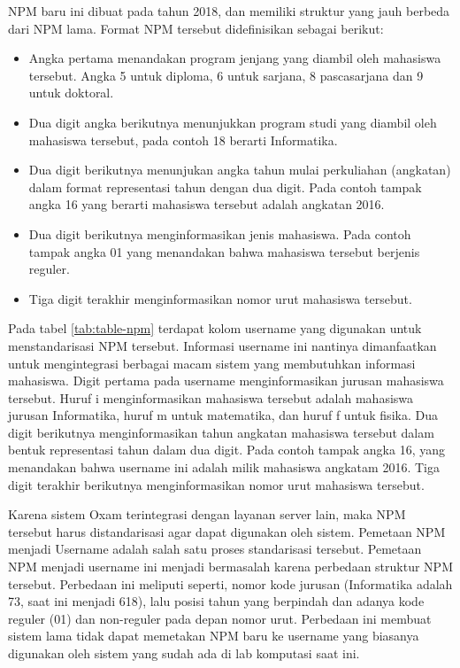 NPM baru ini dibuat pada tahun 2018, dan memiliki struktur yang jauh berbeda
dari NPM lama. Format NPM tersebut didefinisikan sebagai berikut:

\begin{itemize}
    \item Angka pertama menandakan program jenjang yang diambil oleh mahasiswa
    tersebut. Angka 5 untuk diploma, 6 untuk sarjana, 8 pascasarjana dan 9 untuk
    doktoral. 

    \item Dua digit angka berikutnya menunjukkan program studi yang diambil oleh
    mahasiswa tersebut, pada contoh 18 berarti Informatika. 
    
    \item Dua digit berikutnya menunjukan angka tahun mulai perkuliahan
    (angkatan) dalam format representasi tahun dengan dua digit. Pada contoh
    tampak angka 16 yang berarti mahasiswa tersebut adalah angkatan 2016. 
    
    \item Dua digit berikutnya menginformasikan jenis mahasiswa. Pada contoh
    tampak angka 01 yang menandakan bahwa mahasiswa tersebut berjenis reguler.
    
    \item Tiga digit terakhir menginformasikan nomor urut mahasiswa tersebut.
\end{itemize}

Pada tabel \ref{tab:table-npm} terdapat kolom username yang digunakan untuk
menstandarisasi NPM tersebut. Informasi username ini nantinya dimanfaatkan untuk
mengintegrasi berbagai macam sistem yang membutuhkan informasi mahasiswa. Digit
pertama pada username menginformasikan jurusan mahasiswa tersebut. Huruf i
menginformasikan mahasiswa tersebut adalah mahasiswa jurusan Informatika, huruf
m untuk matematika, dan huruf f untuk fisika. Dua digit berikutnya
menginformasikan tahun angkatan mahasiswa tersebut dalam bentuk representasi
tahun dalam dua digit. Pada contoh tampak angka 16, yang menandakan bahwa
username ini adalah milik mahasiswa angkatam 2016. Tiga digit terakhir
berikutnya menginformasikan nomor urut mahasiswa tersebut.

Karena sistem Oxam terintegrasi dengan layanan server lain, maka NPM tersebut
harus distandarisasi agar dapat digunakan oleh sistem. Pemetaan NPM menjadi
Username adalah salah satu proses standarisasi tersebut. Pemetaan NPM menjadi
username ini menjadi bermasalah karena perbedaan struktur NPM tersebut.
Perbedaan ini meliputi seperti, nomor kode jurusan (Informatika adalah 73, saat
ini menjadi 618), lalu posisi tahun yang berpindah dan adanya kode reguler (01)
dan non-reguler pada depan nomor urut. Perbedaan ini membuat sistem lama tidak
dapat memetakan NPM baru ke username yang biasanya digunakan oleh sistem yang
sudah ada di lab komputasi saat ini.


